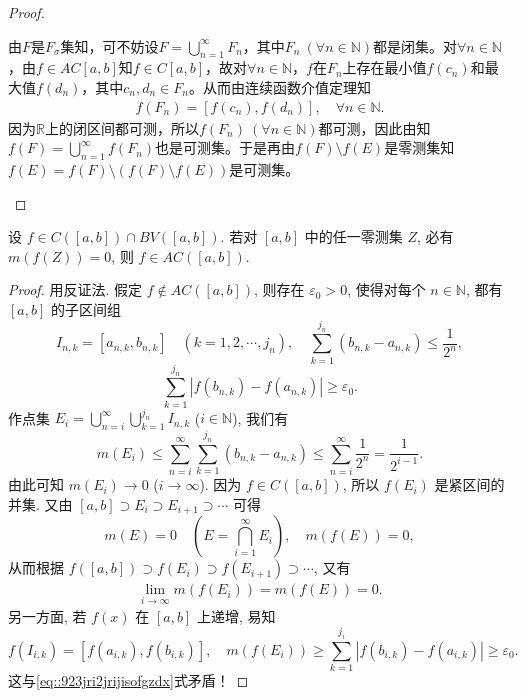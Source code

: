 \documentclass[../../main.tex]{subfiles}%
\begin{document}
\begin{proof}
\begin{enumerate}[(1)]
由$F$是$F_{\sigma}$集知，可不妨设$F=\bigcup\limits_{n=1}^{\infty}F_n$，其中$F_n\ (\forall n\in \mathbb{N})$都是闭集。对$\forall n\in \mathbb{N}$，由$f\in AC[a,b]$知$f\in C[a,b]$，故对$\forall n\in \mathbb{N}$，$f$在$F_n$上存在最小值$f(c_n)$和最大值$f(d_n)$，其中$c_n,d_n\in F_n$。从而由连续函数介值定理知
\begin{align*}
f(F_n)=\left[ f(c_n),f(d_n) \right],\quad \forall n\in \mathbb{N}.
\end{align*}
因为$\mathbb{R}$上的闭区间都可测，所以$f(F_n)\ (\forall n\in \mathbb{N})$都可测，因此由知$f(F)=\bigcup\limits_{n=1}^{\infty}f(F_n)$也是可测集。于是再由$f(F)\setminus f(E)$是零测集知$f(E)=f(F)\setminus (f(F)\setminus f(E))$是可测集。
\end{enumerate}
\end{proof}

\begin{example}
设 $f\in C([a,b])\cap  BV([a,b])$. 若对 $[a,b]$ 中的任一零测集 $Z$, 必有 $m(f(Z))=0$, 则 $f\in  AC([a,b])$.
\end{example}
\begin{proof}
用反证法. 假定 $f\notin  AC([a,b])$, 则存在 $\varepsilon_0>0$, 使得对每个 $n\in\mathbb{N}$, 都有 $[a,b]$ 的子区间组
\[
I_{n,k} = [a_{n,k}, b_{n,k}] \quad (k=1,2,\cdots,j_n), \quad \sum_{k=1}^{j_n} (b_{n,k} - a_{n,k}) \leqslant \frac{1}{2^n},
\]
\[
\sum_{k=1}^{j_n} |f(b_{n,k}) - f(a_{n,k})| \geqslant \varepsilon_0.
\]
作点集 $E_i = \bigcup_{n=i}^{\infty} \bigcup_{k=1}^{j_n} I_{n,k}$ ($i\in\mathbb{N}$), 我们有
\[
m(E_i) \leqslant \sum_{n=i}^{\infty} \sum_{k=1}^{j_n} (b_{n,k} - a_{n,k}) \leqslant \sum_{n=i}^{\infty} \frac{1}{2^n} = \frac{1}{2^{i-1}}.
\]
由此可知 $m(E_i)\to 0$ ($i\to\infty$). 因为 $f\in C([a,b])$, 所以 $f(E_i)$ 是紧区间的并集. 又由 $[a,b]\supset E_i\supset E_{i+1}\supset\cdots$ 可得
\[
m(E) = 0 \quad \left(E = \bigcap_{i=1}^{\infty} E_i\right), \quad m(f(E)) = 0,
\]
从而根据 $f([a,b])\supset f(E_i)\supset f(E_{i+1})\supset\cdots$, 又有
\begin{align}
\lim_{i\to\infty} m(f(E_i)) = m(f(E)) = 0. \label{eq::923jri2jrijisofgzdx}
\end{align}
另一方面, 若 $f(x)$ 在 $[a,b]$ 上递增, 易知
\[
f(I_{i,k}) = [f(a_{i,k}), f(b_{i,k})], \quad m(f(E_i)) \geqslant \sum_{k=1}^{j_i} |f(b_{i,k}) - f(a_{i,k})| \geqslant \varepsilon_0.
\]
这与\eqref{eq::923jri2jrijisofgzdx}式矛盾！
\end{proof}
\end{document}
